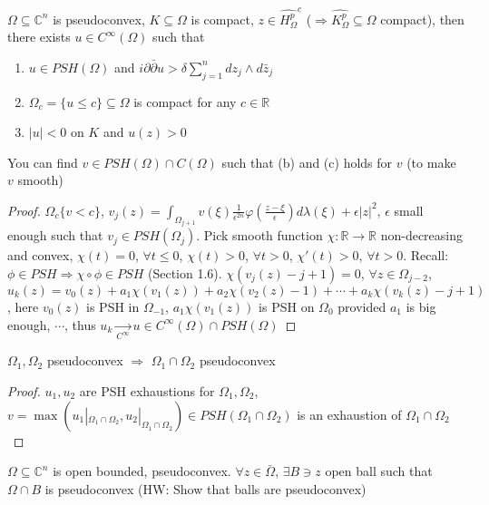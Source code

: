 \documentclass[../main.tex]{subfiles}
\begin{document}
\begin{theorem}
$\Omega\subseteq\mathbb C^n$ is pseudoconvex, $K\subseteq\Omega$ is compact, $z\in\widehat{H^p_\Omega}^c$ ($\Rightarrow\widehat{K^p_\Omega}\subseteq\Omega$ compact), then there exists $u\in C^\infty(\Omega)$ such that
\begin{enumerate}[label=(\alph*)]
\item $u\in PSH(\Omega)$ and $i\partial\bar\partial u>\delta\sum_{j=1}^ndz_j\wedge d\bar z_j$
\item $\Omega_c=\{u\leq c\}\subseteq\Omega$ is compact for any $c\in\mathbb R$
\item $|u|<0$ on $K$ and $u(z)>0$
\end{enumerate}
\end{theorem}

\begin{remark}
You can find $v\in PSH(\Omega)\cap C(\Omega)$ such that (b) and (c) holds for $v$ (to make $v$ smooth)
\end{remark}

\begin{proof}
$\Omega_c\{v<c\}$, $v_j(z)=\int_{\Omega_{j+1}}v(\xi)\frac{1}{\epsilon^{2n}}\varphi(\frac{z-\xi}{\epsilon})d\lambda(\xi)+\epsilon|z|^2$, $\epsilon$ small enough such that $v_j\in PSH(\Omega_j)$. Pick smooth function $\chi:\mathbb R\to\mathbb R$ non-decreasing and convex, $\chi(t)=0$, $\forall t\leq0$, $\chi(t)>0$, $\forall t>0$, $\chi'(t)>0$, $\forall t>0$. Recall: $\phi\in PSH\Rightarrow\chi\circ\phi\in PSH$ (Section 1.6). $\chi(v_j(z)-j+1)=0$, $\forall z\in\Omega_{j-2}$, $u_k(z)=v_0(z)+a_1\chi(v_1(z))+a_2\chi(v_2(z)-1)+\cdots+a_k\chi(v_k(z)-j+1)$, here $v_0(z)$ is PSH in $\Omega_{-1}$, $a_1\chi(v_1(z))$ is PSH on $\Omega_0$ provided $a_1$ is big enough, $\cdots$, thus $u_k\xrightarrow[C^\infty]{}u\in C^\infty(\Omega)\cap PSH(\Omega)$
\end{proof}

\begin{example}
$\Omega_1,\Omega_2$ pseudoconvex $\Rightarrow$ $\Omega_1\cap\Omega_2$ pseudoconvex
\end{example}

\begin{proof}
$u_1,u_2$ are PSH exhaustions for $\Omega_1,\Omega_2$, $v=\max(u_1|_{\Omega_1\cap\Omega_2},u_2|_{\Omega_1\cap\Omega_2})\in PSH(\Omega_1\cap\Omega_2)$ is an exhaustion of $\Omega_1\cap\Omega_2$
\end{proof}

\begin{theorem}
$\Omega\subseteq\mathbb C^n$ is open bounded, pseudoconvex. $\forall z\in\bar\Omega$, $\exists B\ni z$ open ball such that $\Omega\cap B$ is pseudoconvex (HW: Show that balls are pseudoconvex)
\end{theorem}
\end{document}
